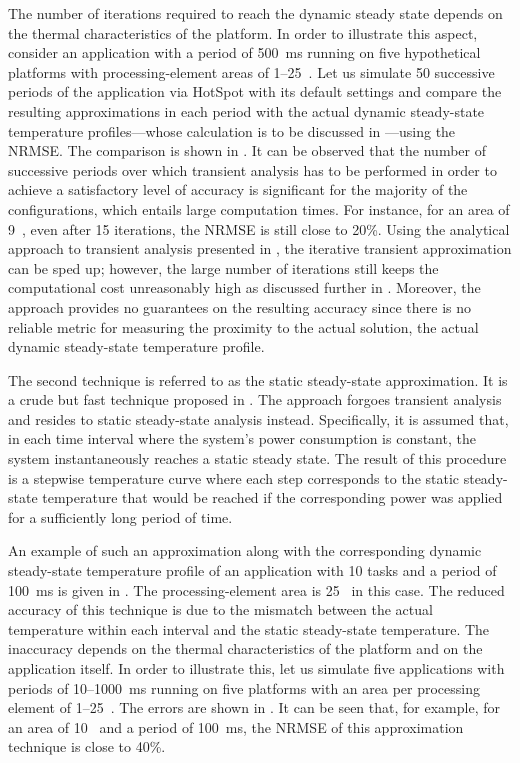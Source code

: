 The number of iterations required to reach the dynamic steady state depends on
the thermal characteristics of the platform. In order to illustrate this aspect,
consider an application with a period of 500~ms running on five hypothetical
platforms with processing-element areas of 1--25~. Let us simulate
50 successive periods of the application via HotSpot with its default settings
and compare the resulting approximations in each period with the actual dynamic
steady-state temperature profiles---whose calculation is to be discussed in
---using the \ac{NRMSE}. The comparison is shown
in . It can be observed that the number
of successive periods over which transient analysis has to be performed in order
to achieve a satisfactory level of accuracy is significant for the majority of
the configurations, which entails large computation times. For instance, for an
area of 9~, even after 15 iterations, the \ac{NRMSE} is still close
to 20\%. Using the analytical approach to transient analysis presented in
, the iterative transient approximation can be sped up;
however, the large number of iterations still keeps the computational cost
unreasonably high as discussed further in .
Moreover, the approach provides no guarantees on the resulting accuracy since
there is no reliable metric for measuring the proximity to the actual solution,
the actual dynamic steady-state temperature profile.

The second technique is referred to as the static steady-state approximation. It
is a crude but fast technique proposed in \cite{huang2009b}. The approach
forgoes transient analysis and resides to static steady-state analysis instead.
Specifically, it is assumed that, in each time interval where the system's power
consumption is constant, the system instantaneously reaches a static steady
state. The result of this procedure is a stepwise temperature curve where each
step corresponds to the static steady-state temperature that would be reached if
the corresponding power was applied for a sufficiently long period of time.

An example of such an approximation along with the corresponding dynamic
steady-state temperature profile of an application with 10 tasks and a period of
100~ms is given in . The processing-element
area is 25~ in this case. The reduced accuracy of this technique is
due to the mismatch between the actual temperature within each interval and the
static steady-state temperature. The inaccuracy depends on the thermal
characteristics of the platform and on the application itself. In order to
illustrate this, let us simulate five applications with periods of 10--1000~ms
running on five platforms with an area per processing element of
1--25~. The errors are shown in
. It can be seen that, for example, for an
area of 10~ and a period of 100~ms, the \ac{NRMSE} of this
approximation technique is close to 40\%.

